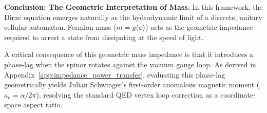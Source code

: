 \textbf{Conclusion: The Geometric Interpretation of Mass.} In this framework, the Dirac equation emerges naturally as the hydrodynamic limit of a discrete, unitary cellular automaton. Fermion mass ($m = y\langle\phi\rangle$) acts as the geometric impedance required to arrest a state from dissipating at the speed of light.

A critical consequence of this geometric mass impedance is that it introduces a phase-lag when the spinor rotates against the vacuum gauge loop. As derived in Appendix~\ref{app:impedance_power_transfer}, evaluating this phase-lag geometrically yields Julian Schwinger's first-order anomalous magnetic moment ($a_e = \alpha/2\pi$), resolving the standard QED vertex loop correction as a coordinate-space aspect ratio.